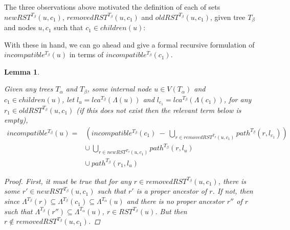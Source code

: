 \documentclass{article}
\newcommand{\leafset}{\Lambda}
\newcommand{\TA}{T_\alpha}
\newcommand{\TB}{T_\beta}
\newtheorem{incompatibilityrecursive}[incompatibility]{Lemma}
\begin{document}
    The three observations above motivated the definition of each of sets $newRST^{\TB}(u, c_1)$, $removedRST^{\TB}(u, c_1)$ and $oldRST^{\TB}(u, c_1)$, given tree $\TB$ and nodes $u, c_1$ such that $c_1 \in children(u)$:

    With these in hand, we can go ahead and give a formal recursive formulation of $incompatible^{\TB}(u)$ in terms of $incompatible^{\TB}(c_1)$.
    \newline

    \begin{incompatibilityrecursive}
        \label{lem:incompatibilityrecursive}

        Given any trees $\TA$ and $\TB$, some internal node $u \in V(\TA)$ and $c_1 \in children(u)$, let $l_u = lca^{\TB}(\leafset(u))$ and $l_{c_1} = lca^{\TB}(\leafset(c_1))$, for any $r_1 \in oldRST^{\TB}(u, c_1)$ (if this does not exist then the relevant term below is empty),
        \begin{align*}
            incompatible^{\TB}(u) = &\left(incompatible^{\TB}(c_1)\ -\ \bigcup_{r \in removedRST^{\TB}(u, c_1)} path^{\TB}(r, l_{c_1})\right)\\
            &\cup\ \bigcup_{r \in newRST^{\TB}(u, c_1)} path^{\TB}(r, l_u)\\
            &\cup\ path^{\TB}(r_1, l_u)
        \end{align*}

        \begin{proof}
            First, it must be true that for any $r \in removedRST^{\TB}(u, c_1)$, there is some $r' \in newRST^{\TB}(u, c_1)$ such that $r'$ is a proper ancestor of $r$. If not, then since $\leafset^{\TB}(r) \subseteq \leafset^{\TB}(c_1) \subseteq \leafset^{\TA}(u)$ and there is no proper ancestor $r''$ of $r$ such that $\leafset^{\TB}(r'') \subseteq \leafset^{\TA}(u)$, $r \in RST^{\TB}(u)$. But then $r \not\in removedRST^{\TB}(u, c_1)$.


\end{proof}
\end{incompatibilityrecursive}
\end{document}
